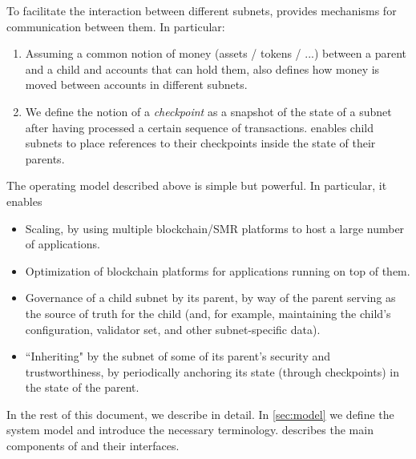 To facilitate the interaction between different subnets, \ipc provides mechanisms for communication between them.
In particular:
\begin{enumerate}
    \item Assuming a common notion of money (assets / tokens / ...) between a parent and a child and accounts that can hold them, \ipc also defines how money is moved between accounts in different subnets.
    \item We define the notion of a \emph{checkpoint} as a snapshot of the state of a subnet after having processed a certain sequence of transactions.
    \ipc enables child subnets to place references to their checkpoints inside the state of their parents.
\end{enumerate}

The operating model described above is simple but powerful.
In particular, it enables
\begin{itemize}
    \item Scaling, by using multiple blockchain/SMR platforms to host a large number of applications.
    \item Optimization of blockchain platforms for applications running on top of them.
    \item Governance of a child subnet by its parent, by way of the parent serving as the source of truth for the child (and, for example, maintaining the child's configuration, validator set, and other subnet-specific data).
    \item ``Inheriting" by the subnet of some of its parent's security and trustworthiness, by periodically anchoring its state (through checkpoints) in the state of the parent.
\end{itemize}

In the rest of this document, we describe \ipc in detail.
In \cref{sec:model} we define the system model and introduce the necessary terminology.
 describes the main components of \ipc and their interfaces.
